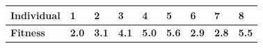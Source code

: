 \documentclass{article}
\begin{document}
\begin{center}
\begin{tabular}{|l|l|l|l|l|l|l|l|l|} 
\hline
\textbf{Individual} & 1                                                & 2                                                & 3                                                & 4                                                & 5                                                & 6                                                & 7                                                & 8                                                 \\ 
\hline
\textbf{Fitness}    & \textcolor[rgb]{0.263,0.263,0.263}{\textbf{2.0}} & \textcolor[rgb]{0.263,0.263,0.263}{\textbf{3.1}} & \textcolor[rgb]{0.263,0.263,0.263}{\textbf{4.1}} & \textcolor[rgb]{0.263,0.263,0.263}{\textbf{5.0}} & \textcolor[rgb]{0.263,0.263,0.263}{\textbf{5.6}} & \textcolor[rgb]{0.263,0.263,0.263}{\textbf{2.9}} & \textcolor[rgb]{0.263,0.263,0.263}{\textbf{2.8}} & \textcolor[rgb]{0.263,0.263,0.263}{\textbf{5.5}}  \\
\hline
\end{tabular}
\end{center}
\end{document}
